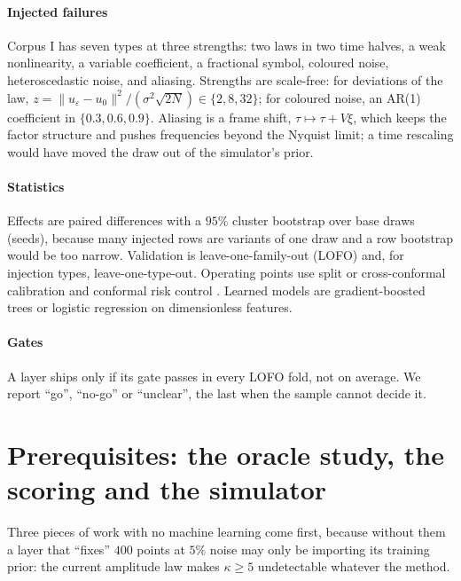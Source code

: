 \documentclass[11pt]{article}
\theoremstyle{plain}
\theoremstyle{definition}
\theoremstyle{remark}
\begin{document}
\paragraph{Injected failures} Corpus I has seven types at three strengths: two laws in two time halves, a weak
nonlinearity, a variable coefficient, a fractional symbol, coloured noise, heteroscedastic noise, and aliasing. Strengths are scale-free:
for deviations of the law, $z=\lVert u_\varepsilon-u_0\rVert^2/(\sigma^2\sqrt{2N})\in\{2,8,32\}$; for coloured noise, an AR(1) coefficient in $\{0.3,0.6,0.9\}$.
Aliasing is a frame shift, $\tau\mapsto\tau+V\xi$, which keeps the factor structure and pushes frequencies beyond the Nyquist
limit; a time rescaling would have moved the draw out of the simulator's prior.

\paragraph{Statistics} Effects are paired differences with a $95\%$ cluster bootstrap over base draws (seeds), because many
injected rows are variants of one draw and a row bootstrap would be too narrow. Validation is leave-one-family-out (LOFO) and, for
injection types, leave-one-type-out. Operating points use split or cross-conformal calibration \cite{BarEtAl21} and
conformal risk control \cite{AngEtAl24}. Learned models are gradient-boosted trees \cite{Fri01} or logistic regression on
dimensionless features.

\paragraph{Gates} A layer ships only if its gate passes in every LOFO fold, not on average. We report ``go'', ``no-go'' or
``unclear'', the last when the sample cannot decide it.


\section{Prerequisites: the oracle study, the scoring and the simulator}\label{sec:p0}
Three pieces of work with no machine learning come first, because without them a layer that ``fixes'' $400$ points at $5\%$ noise may only be importing its training prior: the current amplitude law makes $\kappa\ge5$ undetectable whatever the method.
\end{document}
